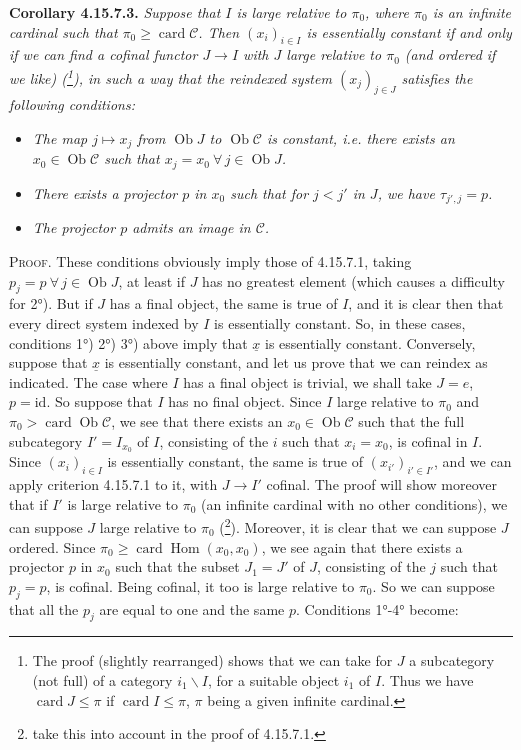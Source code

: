 \documentclass[11pt]{article}
\newcommand{\printedpage}[1]{\marginpar{\footnotesize p.~#1}}
\newcommand{\msp}[1]{\marginpar{\footnotesize [#1]}}
\newcommand{\ux}{\underline{x}}
\newcommand{\cC}{\mathcal{C}}
\newcommand{\Ob}{\operatorname{Ob}}
\newcommand{\card}{\operatorname{card}}
\newcommand{\id}{\mathrm{id}}
\newcommand{\Hom}{\operatorname{Hom}}
\begin{document}
\printedpage{170}
\msp{page 443}
\textbf{Corollary 4.15.7.3.} \textit{Suppose that $I$ is large relative to $\pi_0$, where $\pi_0$ is an infinite cardinal such that $\pi_0 \geqslant \card \cC$. Then $(x_i)_{i\in I}$ is essentially constant if and only if we can find a cofinal functor $J \longrightarrow I$ with $J$ large relative to $\pi_0$ (and ordered if we like) (\footnote{The proof (slightly rearranged) shows that we can take for $J$ a subcategory (not full) of a category $i_1\backslash I$, for a suitable object $i_1$ of $I$. Thus we have $\card J \leqslant \pi$ if $\card I \leqslant \pi$, $\pi$ being a given infinite cardinal.}), in such a way that the reindexed system $(x_j)_{j\in J}$ satisfies the following conditions:}
\begin{itemize}
\item[\textit{1°)}] \textit{The map $j \longmapsto x_j$ from $\Ob J$ to $\Ob\cC$ is constant, i.e. there exists an $x_0 \in \Ob\cC$ such that $x_j = x_0\ \forall\, j \in \Ob J$.}
\item[\textit{2°)}] \textit{There exists a projector $p$ in $x_0$ such that for $j < j'$ in $J$, we have $\tau_{j',j} = p$.}
\item[\textit{3°)}] \textit{The projector $p$ admits an image in $\cC$.}
\end{itemize}
\textsc{Proof}. These conditions obviously imply those of 4.15.7.1, taking $p_j = p\ \forall\, j \in \Ob J$, at least if $J$ has no greatest element (which causes a difficulty for 2°). But if $J$ has a final object, the same is true of $I$, and it is clear then that every direct system indexed by $I$ is essentially constant. So, in these cases, conditions 1°) 2°) 3°) above imply that $\ux$ is essentially constant. Converse\msp{page 444}ly, suppose that $\ux$ is essentially constant, and let us prove that we can reindex as indicated. The case where $I$ has a final object is trivial, we shall take $J = e$, $p = \id$. So suppose that $I$ has no final object. Since $I$ large relative to $\pi_0$ and $\pi_0 > \card\Ob\cC$, we see that there exists an $x_0 \in \Ob\cC$ such that the full subcategory $I' = I_{x_0}$ of $I$, consisting of the $i$ such that $x_i = x_0$, is cofinal in $I$. Since $(x_i)_{i\in I}$ is essentially constant, the same is true of $(x_{i'})_{i'\in I'}$, and we can apply criterion 4.15.7.1 to it, with \marginpar{$\Vert$}%
$J \longrightarrow I'$ cofinal. The proof will show moreover that if $I'$ is large relative to $\pi_0$ (an infinite cardinal with no other conditions), we can suppose $J$ large relative to $\pi_0$ (\footnote{take this into account in the proof of 4.15.7.1.}). Moreover, it is clear that we can suppose $J$ ordered. Since $\pi_0 \geqslant \card\Hom(x_0,x_0)$, we see again that there exists a projector $p$ in $x_0$ such that the subset $J_1 = J'$ of $J$, consisting of the $j$ such that $p_j = p$, is cofinal. Being cofinal, it too is large relative to $\pi_0$. So we can suppose that all the $p_j$ are equal to one and the same $p$. Conditions 1°-4° become:
\end{document}
